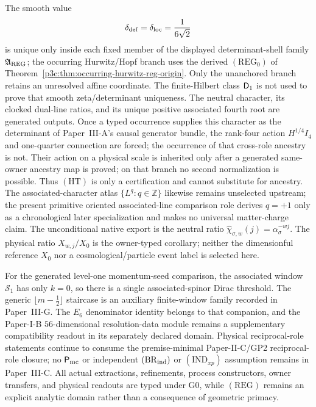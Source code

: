 \documentclass[12pt,a4paper]{article}
\begin{document}
The smooth value
\[
        \delta_{\mathrm{def}}=\delta_{\rm loc}=\frac1{6\sqrt2}
\]
is unique only inside each fixed member of the displayed determinant-shell
family \(\mathfrak A_{\rm REG}\); the occurring Hurwitz/Hopf branch uses the derived \((\mathrm{REG}_0)\) of Theorem~\ref{p3c:thm:occurring-hurwitz-reg-origin}. Only the unanchored branch retains an unresolved affine coordinate.
The finite-Hilbert class \(\mathsf{D}_1\) is not used to prove that smooth zeta/determinant
uniqueness.  The neutral character, its clocked dual-line ratios, and its
unique positive associated fourth root are generated outputs.  Once a typed
occurrence supplies this character as the determinant of Paper~III-A's causal
generator bundle, the rank-four action \(H^{1/4}I_4\) and one-quarter
connection are forced; the occurrence of that cross-role ancestry is not.
Their action on a physical scale is inherited only after
a generated same-owner ancestry map is proved; on that branch no second
normalization is possible.  Thus \((\mathrm{HT})\) is only a
certification and cannot substitute for ancestry.  The
associated-character atlas \(\{L^q:q\in\mathbb Z\}\) likewise remains
unselected upstream; the present primitive oriented associated-line comparison
role derives \(q=+1\) only as a chronological later specialization and makes
no universal matter-charge claim.  The unconditional native export is the
neutral ratio \(\widehat\chi_{\sigma,w}(j)=\alpha_\sigma^{-wj}\).  The physical ratio
\(X_{w,j}/X_0\) is the owner-typed corollary; neither the dimensionful
reference \(X_0\) nor a cosmological/particle event label is selected here.

For the generated level-one momentum-seed comparison, the associated window \(\mathcal S_1\) has only
\(k=0\), so there is a single associated-spinor Dirac threshold.  The generic
\(\lfloor m-\tfrac12\rfloor\) staircase is an auxiliary finite-window family
recorded in Paper~III-G.  The \(E_6\) denominator identity belongs to that companion, and the Paper-I-B
\(56\)-dimensional resolution-data module remains a supplementary compatibility
readout in its separately declared domain.  Physical reciprocal-role
statements continue to consume the premise-minimal Paper-II-C/GP2
reciprocal-role closure; no \(\mathsf P_{\rm mc}\) or independent
\( (\mathrm{BR}_{\rm ind}) \)
or \( (\mathrm{IND}_{xp}) \) assumption remains in Paper~III-C.
All actual extractions, refinements, process constructors, owner transfers,
and physical readouts are typed under G0, while \((\mathrm{REG})\) remains an
explicit analytic domain rather than a consequence of geometric primacy.
\end{document}
